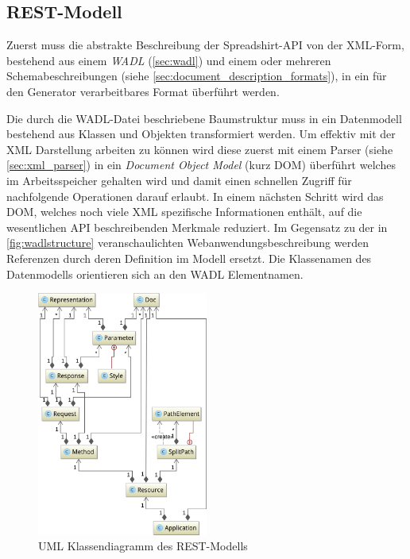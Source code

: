 \subsection{REST-Modell}
\label{sec:rest_model}

Zuerst muss die abstrakte Beschreibung der Spreadshirt-API von der XML-Form, bestehend aus einem \emph{WADL} (\cref{sec:wadl}) und einem oder mehreren Schemabeschreibungen (siehe \cref{sec:document_description_formats}), in ein für den Generator verarbeitbares Format überführt werden.

Die durch die WADL-Datei beschriebene Baumstruktur muss in ein Datenmodell bestehend aus Klassen und Objekten transformiert werden.
Um effektiv mit der XML Darstellung arbeiten zu können wird diese zuerst mit einem Parser (siehe \cref{sec:xml_parser}) in ein \emph{Document Object Model} (kurz DOM) überführt welches im Arbeitsspeicher gehalten wird und damit einen schnellen Zugriff für nachfolgende Operationen darauf erlaubt. In einem nächsten Schritt wird das DOM, welches noch viele XML spezifische Informationen enthält, auf die wesentlichen API beschreibenden Merkmale reduziert. Im Gegensatz zu der in \cref{fig:wadlstructure} veranschaulichten Webanwendungsbeschreibung werden Referenzen durch deren Definition im Modell ersetzt. Die Klassenamen des Datenmodells orientieren sich an den WADL Elementnamen.

\begin{figure}[tb]
    \centering
    \includegraphics[width=0.5\textwidth]{resources/restmodel}
    \caption{UML Klassendiagramm des REST-Modells}
    \label{fig:restmodel}
\end{figure}

